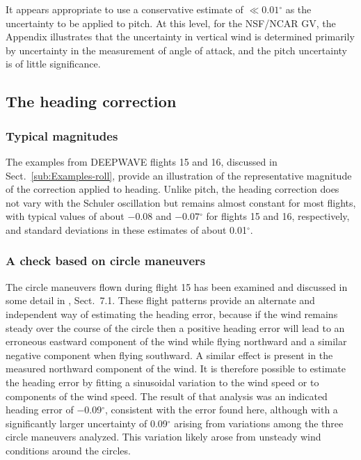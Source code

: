 \documentclass[english,british,amtd,bookmarks=false,unicode=true]{copernicus}\usepackage[]{graphicx}\usepackage[]{color}
\begin{document}
It appears appropriate to use a conservative estimate of $\ll0.01{}^{\circ}$
as the uncertainty to be applied to pitch. At this level, for the
NSF/NCAR GV, the Appendix illustrates that the uncertainty in vertical
wind is determined primarily by uncertainty in the measurement of
angle of attack, and the pitch uncertainty is of little significance.


\subsection{The heading correction}


\subsubsection{Typical magnitudes}

The examples from DEEPWAVE flights 15 and 16, discussed in Sect.~\ref{sub:Examples-roll},
provide an illustration of the representative magnitude of the correction
applied to heading. Unlike pitch, the heading correction does not
vary with the Schuler oscillation but remains almost constant for
most flights, with typical values of about \ensuremath{-0.08}
and \ensuremath{-0.07}$^{\circ}$ for flights 15 and 16, respectively,
and standard deviations in these estimates of about 0.01$^{\circ}$. 


\subsubsection{A check based on circle maneuvers}

The circle maneuvers flown during flight 15 has been examined and
discussed in some detail in \citet{Cooper2016ncartn}, Sect.~7.1.
These flight patterns provide an alternate and independent way of
estimating the heading error, because if the wind remains steady over
the course of the circle then a positive heading error will lead to
an erroneous eastward component of the wind while flying northward
and a similar negative component when flying southward. A similar
effect is present in the measured northward component of the wind.
It is therefore possible to estimate the heading error by fitting
a sinusoidal variation to the wind speed or to components of the wind
speed. The result of that analysis was an indicated heading error
of $-$0.09$^{\circ}$, consistent with the error found here, although
with a significantly larger uncertainty of 0.09$^{\circ}$ arising
from variations among the three circle maneuvers analyzed. This variation
likely arose from unsteady wind conditions around the circles.
\end{document}
